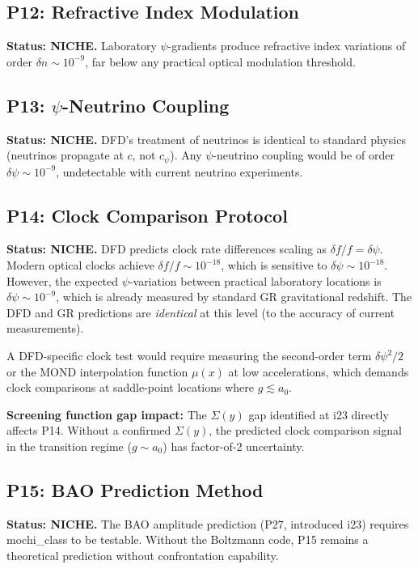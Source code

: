 \documentclass[11pt]{article}
\newcommand{\aM}{a_0}
\begin{document}
\subsection{P12: Refractive Index Modulation}

\textbf{Status: NICHE.} Laboratory $\psi$-gradients produce refractive
index variations of order $\delta n \sim 10^{-9}$, far below any
practical optical modulation threshold.

\subsection{P13: $\psi$-Neutrino Coupling}

\textbf{Status: NICHE.} DFD's treatment of neutrinos is identical to
standard physics (neutrinos propagate at $c$, not $c_\psi$). Any
$\psi$-neutrino coupling would be of order $\delta\psi \sim 10^{-9}$,
undetectable with current neutrino experiments.

\subsection{P14: Clock Comparison Protocol}

\textbf{Status: NICHE.} DFD predicts clock rate differences scaling
as $\delta f/f = \delta\psi$. Modern optical clocks achieve $\delta f/f
\sim 10^{-18}$, which is sensitive to $\delta\psi \sim 10^{-18}$.
However, the expected $\psi$-variation between practical laboratory
locations is $\delta\psi \sim 10^{-9}$, which is already measured by
standard GR gravitational redshift. The DFD and GR predictions are
\emph{identical} at this level (to the accuracy of current measurements).

A DFD-specific clock test would require measuring the second-order
term $\delta\psi^2/2$ or the MOND interpolation function $\mu(x)$
at low accelerations, which demands clock comparisons at saddle-point
locations where $g \lesssim \aM$.

\textbf{Screening function gap impact:} The $\Sigma(y)$ gap identified
at i23 directly affects P14. Without a confirmed $\Sigma(y)$, the
predicted clock comparison signal in the transition regime ($g \sim \aM$)
has factor-of-2 uncertainty.

\subsection{P15: BAO Prediction Method}

\textbf{Status: NICHE.} The BAO amplitude prediction (P27, introduced i23)
requires mochi\_class to be testable. Without the Boltzmann code, P15
remains a theoretical prediction without confrontation capability.
\end{document}
